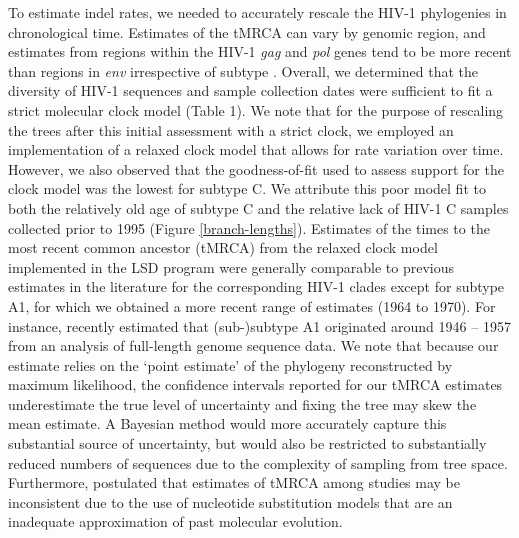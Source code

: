 \documentclass[12pt]{article}
\begin{document}
To estimate indel rates, we needed to accurately rescale the HIV-1 phylogenies in chronological time.
Estimates of the tMRCA can vary by genomic region, and estimates from regions within the HIV-1 \textit{gag} and \textit{pol} genes tend to be more recent than regions in \textit{env} irrespective of subtype \citep{olabode2018evidence}.
Overall, we determined that the diversity of HIV-1 sequences and sample collection dates were sufficient to fit a strict molecular clock model (Table 1).
We note that for the purpose of rescaling the trees after this initial assessment with a strict clock, we employed an implementation of a relaxed clock model that allows for rate variation over time.
However, we also observed that the goodness-of-fit used to assess support for the clock model was the lowest for subtype C.
We attribute this poor model fit to both the relatively old age of subtype C \citep{Wertheim:2011} and the relative lack of HIV-1 C samples collected prior to 1995 (Figure \ref{branch-lengths}). 
Estimates of the times to the most recent common ancestor (tMRCA) from the relaxed clock model implemented in the LSD program were generally comparable to previous estimates in the literature for the corresponding HIV-1 clades \citep{Hemelaar:2012, Wertheim:2011} except for subtype A1, for which we obtained a more recent range of estimates (1964 to 1970).
For instance, \citet{tongo2018unravelling} recently estimated that (sub-)subtype A1 originated around 1946 -- 1957 from an analysis of full-length genome sequence data.
We note that because our estimate relies on the `point estimate' of the phylogeny reconstructed by maximum likelihood, the confidence intervals reported for our tMRCA estimates underestimate the true level of uncertainty and fixing the tree may skew the mean estimate.
A Bayesian method would more accurately capture this substantial source of uncertainty, but would also be restricted to substantially reduced numbers of sequences due to the complexity of sampling from tree space.
Furthermore, \citet{Wertheim:2011} postulated that estimates of tMRCA among studies may be inconsistent due to the use of nucleotide substitution models that are an inadequate approximation of past molecular evolution.
\end{document}
